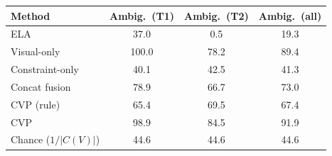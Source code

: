 \begin{tabular}{lccc}
\toprule
Method & Ambig.\ (T1) & Ambig.\ (T2) & Ambig.\ (all)\\
\midrule
ELA & 37.0 & 0.5 & 19.3\\
Visual-only & 100.0 & 78.2 & 89.4\\
Constraint-only & 40.1 & 42.5 & 41.3\\
Concat fusion & 78.9 & 66.7 & 73.0\\
CVP (rule) & 65.4 & 69.5 & 67.4\\
CVP & 98.9 & 84.5 & 91.9\\
\midrule
Chance ($1/|C(V)|$) & 44.6 & 44.6 & 44.6\\
\bottomrule
\end{tabular}

